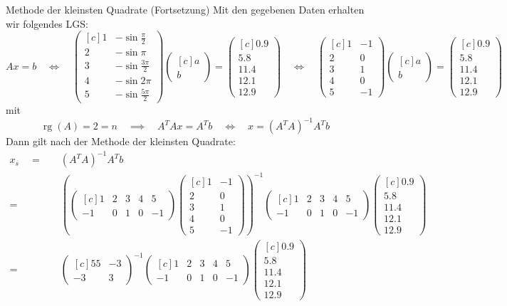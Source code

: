 \documentclass[german]{../spicker}
\newcommand{\vektor}[1]{\begin{pmatrix*}[c] #1 \end{pmatrix*}}
\newcommand{\rg}{\operatorname{rg}}
\begin{document}
\begin{example}{Methode der kleinsten Quadrate (Fortsetzung)}
    Mit den gegebenen Daten erhalten wir folgendes LGS:
    $$
        Ax = b \quad \iff \quad \vektor{1 & -\sin \frac{\pi}{2} \\ 2 & -\sin \pi \\ 3 & -\sin \frac{3\pi}{2} \\ 4 & -\sin 2 \pi \\ 5 & -\sin \frac{5\pi}{2}}\vektor{a \\ b} = \vektor{0.9 \\ 5.8 \\ 11.4 \\ 12.1 \\ 12.9} \quad \iff \quad \vektor{1 & -1 \\ 2 & 0 \\ 3 & 1 \\ 4 & 0 \\ 5 & -1}\vektor{a \\ b} = \vektor{0.9 \\ 5.8 \\ 11.4 \\ 12.1 \\ 12.9}
    $$
    mit
    $$
        \rg(A) = 2 = n \quad \implies \quad A^TAx = A^Tb \quad \iff \quad x = \left(A^T A\right)^{-1} A^T b
    $$
    Dann gilt nach der Methode der kleinsten Quadrate:
    $$
        \begin{aligned}
            x_s \quad = \quad & \left(A^T A\right)^{-1} A^T b                     \\
            = \quad           & \left(\vektor{1               & 2  & 3  & 4  & 5  \\ -1 & 0 & 1 & 0 & -1} \vektor{1 & -1 \\ 2 & 0 \\ 3 & 1 \\ 4 & 0 \\ 5 & -1}\right)^{-1} \vektor{1 & 2 & 3 & 4 & 5 \\ -1 & 0 & 1 & 0 & -1} \vektor{0.9 \\ 5.8 \\ 11.4 \\ 12.1 \\ 12.9} \\
            = \quad           & \vektor{55                    & -3                \\ -3 & 3}^{-1} \vektor{1 & 2 & 3 & 4 & 5 \\ -1 & 0 & 1 & 0 & -1} \vektor{0.9 \\ 5.8 \\ 11.4 \\ 12.1 \\ 12.9} \\

\end{aligned}$$
\end{example}
\end{document}
